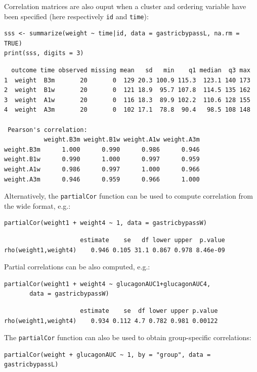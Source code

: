 \documentclass[12pt]{article}
\begin{document}
Correlation matrices are also ouput when a cluster and ordering
variable have been specified (here respectively \texttt{id} and \texttt{time}):
\lstset{language=r,label= ,caption= ,captionpos=b,numbers=none}
\begin{lstlisting}
sss <- summarize(weight ~ time|id, data = gastricbypassL, na.rm = TRUE)
print(sss, digits = 3)
\end{lstlisting}

\begin{verbatim}
  outcome time observed missing mean   sd   min    q1 median  q3 max
1  weight  B3m       20       0  129 20.3 100.9 115.3  123.1 140 173
2  weight  B1w       20       0  121 18.9  95.7 107.8  114.5 135 162
3  weight  A1w       20       0  116 18.3  89.9 102.2  110.6 128 155
4  weight  A3m       20       0  102 17.1  78.8  90.4   98.5 108 148

 Pearson's correlation: 
           weight.B3m weight.B1w weight.A1w weight.A3m
weight.B3m      1.000      0.990      0.986      0.946
weight.B1w      0.990      1.000      0.997      0.959
weight.A1w      0.986      0.997      1.000      0.966
weight.A3m      0.946      0.959      0.966      1.000
\end{verbatim}

Alternatively, the \texttt{partialCor} function can be used to compute
correlation from the wide format, e.g.:
\lstset{language=r,label= ,caption= ,captionpos=b,numbers=none}
\begin{lstlisting}
partialCor(weight1 + weight4 ~ 1, data = gastricbypassW)
\end{lstlisting}

\begin{verbatim}
                     estimate    se   df lower upper  p.value
rho(weight1,weight4)    0.946 0.105 31.1 0.867 0.978 8.46e-09
\end{verbatim}


Partial correlations can be also computed, e.g.:
\lstset{language=r,label= ,caption= ,captionpos=b,numbers=none}
\begin{lstlisting}
partialCor(weight1 + weight4 ~ glucagonAUC1+glucagonAUC4,
	   data = gastricbypassW)
\end{lstlisting}

\begin{verbatim}
                     estimate    se  df lower upper p.value
rho(weight1,weight4)    0.934 0.112 4.7 0.782 0.981 0.00122
\end{verbatim}


The \texttt{partialCor} function can also be used to obtain group-specific
correlations:
\lstset{language=r,label= ,caption= ,captionpos=b,numbers=none}
\begin{lstlisting}
partialCor(weight + glucagonAUC ~ 1, by = "group", data = gastricbypassL)
\end{lstlisting}
\end{document}
